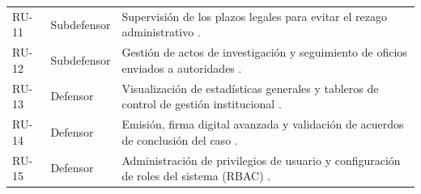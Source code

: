 \begin{table}[h!]
\begin{tabular}{@{} l l p{8.5cm} @{}}
\rowcolor[HTML]{F2F4F7} 
RU-11 & Subdefensor & Supervisión de los plazos legales para evitar el rezago administrativo . \\
RU-12 & Subdefensor & Gestión de actos de investigación y seguimiento de oficios enviados a autoridades . \\ \midrule

\rowcolor[HTML]{F2F4F7} 
RU-13 & Defensor & Visualización de estadísticas generales y tableros de control de gestión institucional . \\
RU-14 & Defensor & Emisión, firma digital avanzada y validación de acuerdos de conclusión del caso . \\
\rowcolor[HTML]{F2F4F7} 
RU-15 & Defensor & Administración de privilegios de usuario y configuración de roles del sistema (RBAC) . \\ \bottomrule
\end{tabular}
\end{table}